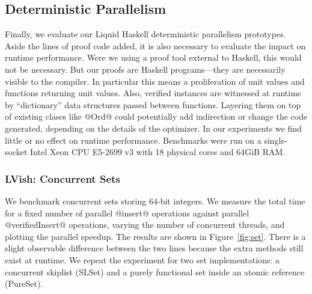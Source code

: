 \subsection{Deterministic Parallelism}\label{sec:eval-parallelism}


Finally, we evaluate our Liquid Haskell deterministic
parallelism prototypes.  Aside the lines of proof code added, it is also
necessary to evaluate the impact on runtime performance.
%
Were we using a proof tool external to Haskell, this would not be necessary.
But our proofs are Haskell programs---they are necessarily visible to the
compiler.  In particular this means a proliferation of unit values and functions
returning unit values.  Also, verified instances are witnessed at runtime by
``dictionary'' data structures passed between functions.  Layering them on top
of existing clases like @Ord@ could potentially add indirection or change the
code generated, depending on the details of the optimizer.
%
%
In our experiments we find little or no effect on runtime performance.
Benchmarks were run on a single-socket Intel{\textregistered}
Xeon{\textregistered} CPU E5-2699 v3 with 18 physical cores and 64GiB RAM.

\subsubsection{LVish: Concurrent Sets}
\label{sec:set}

We benchmark concurrent sets storing 64-bit integers.
We measure the total time for a fixed number of parallel @insert@ operations
against parallel @verifiedInsert@ operations, varying the number of concurrent
threads, and plotting the parallel speedup. The results are shown in
Figure~\ref{fig:set}. There is a slight observable difference between the two
lines because the extra methods still exist at runtime.
%
We repeat the experiment for two set implementations: a concurrent skiplist
(SLSet) and a purely functional set inside an atomic reference (PureSet).

